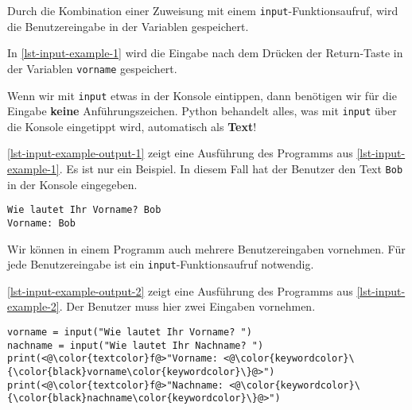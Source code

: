 Durch die Kombination einer Zuweisung mit einem \lstinline{input}-Funktionsaufruf, wird die Benutzereingabe in der Variablen gespeichert.

\begin{example}
	In \autoref{lst-input-example-1} wird die Eingabe nach dem Drücken der Return-Taste in der Variablen \lstinline{vorname} gespeichert.
\end{example}

\begin{important}
 Wenn wir mit \lstinline{input} etwas in der Konsole eintippen, dann benötigen wir für die Eingabe \textbf{keine} Anführungszeichen. Python behandelt alles, was mit \lstinline{input} über die Konsole eingetippt wird, automatisch als \textbf{Text}! 
\end{important}

\begin{example}
	\autoref{lst-input-example-output-1} zeigt eine Ausführung des Programms aus \autoref{lst-input-example-1}. Es ist nur ein Beispiel. In diesem Fall hat der Benutzer den Text \lstinline{Bob} in der Konsole eingegeben.
\end{example}

\begin{lstlisting}[caption={Beispielausführung für das Programm aus \autoref{lst-input-example-1}.}, label=lst-input-example-output-1, language=output]
Wie lautet Ihr Vorname? Bob
Vorname: Bob
\end{lstlisting}	

Wir können in einem Programm auch mehrere Benutzereingaben vornehmen. Für jede Benutzereingabe ist ein \lstinline{input}-Funktionsaufruf notwendig.

\begin{example}
	\autoref{lst-input-example-output-2} zeigt eine Ausführung des Programms aus \autoref{lst-input-example-2}. Der Benutzer muss hier zwei Eingaben vornehmen.
\end{example}

\begin{lstlisting}[caption={Zwei Eingaben in einem Programm.}, label={lst-input-example-2}]
vorname = input("Wie lautet Ihr Vorname? ")
nachname = input("Wie lautet Ihr Nachname? ")
print(<@\color{textcolor}f@>"Vorname: <@\color{keywordcolor}\{\color{black}vorname\color{keywordcolor}\}@>")
print(<@\color{textcolor}f@>"Nachname: <@\color{keywordcolor}\{\color{black}nachname\color{keywordcolor}\}@>")
\end{lstlisting}

